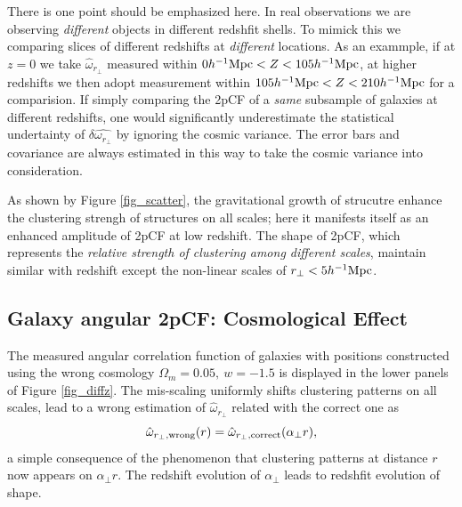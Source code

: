 \documentclass[iop]{emulateapj}
\begin{document}
There is one point should be emphasized here.
In real observations we are observing {\it different} objects in different redshfit shells.
To mimick this we comparing slices of different redshifts at {\it different} locations.
As an exammple, if at $z=0$ we take $\hat\omega_{r_\perp}$ measured within $0h^{-1}{\rm Mpc}<Z<105 h^{-1}{\rm Mpc}$,
at higher redshifts we then adopt measurement within $105h^{-1}{\rm Mpc}<Z<210 h^{-1}{\rm Mpc}$ for a comparision.
If simply comparing the 2pCF of a {\it same} subsample of galaxies at different redshifts, 
one would significantly underestimate the statistical undertainty of $\delta \hat{\omega_{r_\perp}}$ by ignoring the cosmic variance.
The error bars and covariance are always estimated in this way to take the cosmic variance into consideration.


As shown by Figure \ref{fig_scatter}, the gravitational growth of strucutre enhance the clustering strengh of structures on all scales;
here it manifests itself as an enhanced amplitude of 2pCF at low redshift.
The shape of 2pCF, which represents the {\it relative strength of clustering among different scales},
maintain similar with redshift except the non-linear scales of $r_\perp < 5 h^{-1}\rm Mpc$.


\subsection{Galaxy angular 2pCF: Cosmological Effect }

The measured angular correlation function of galaxies with positions constructed using the wrong cosmology $\Omega_m=0.05,\ w=-1.5$
is displayed in the lower panels of Figure \ref{fig_diffz}.
The mis-scaling uniformly shifts clustering patterns on all scales, lead to a wrong estimation of $\hat \omega_{r_\perp}$ 
related with the correct one as
\begin{equation}
 \hat \omega_{r_\perp,\rm wrong}(r) = \hat \omega_{r_\perp, \rm correct}(\alpha_{\perp} r),
\end{equation}
a simple consequence of the phenomenon that clustering patterns at distance $r$ now appears on $\alpha_{\perp} r$.
The redshift evolution of $\alpha_{\perp}$ leads to redshfit evolution of shape.
\end{document}
